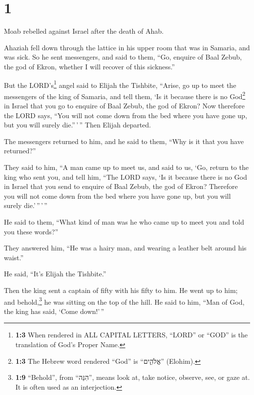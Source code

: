 \hypertarget{section}{%
\section{1}\label{section}}

 Moab rebelled against Israel after the death of Ahab.

 Ahaziah fell down through the lattice in his upper room
that was in Samaria, and was sick. So he sent messengers, and said to
them, ``Go, enquire of Baal Zebub, the god of Ekron, whether I will
recover of this sickness.''

 But the LORD's\footnote{\textbf{1:3} When rendered in ALL
  CAPITAL LETTERS, ``LORD'' or ``GOD'' is the translation of God's
  Proper Name.} angel said to Elijah the Tishbite, ``Arise, go up to
meet the messengers of the king of Samaria, and tell them, `Is it
because there is no God\footnote{\textbf{1:3} The Hebrew word rendered
  ``God'' is ``אֱלֹהִ֑ים'' (Elohim).} in Israel that you go to enquire
of Baal Zebub, the god of Ekron?  Now therefore the LORD
says, ``You will not come down from the bed where you have gone up, but
you will surely die.''\,'\,'' Then Elijah departed.

 The messengers returned to him, and he said to them,
``Why is it that you have returned?''

 They said to him, ``A man came up to meet us, and said to
us, `Go, return to the king who sent you, and tell him, ``The LORD says,
`Is it because there is no God in Israel that you send to enquire of
Baal Zebub, the god of Ekron? Therefore you will not come down from the
bed where you have gone up, but you will surely die.'\,''\,'\,''

 He said to them, ``What kind of man was he who came up to
meet you and told you these words?''

 They answered him, ``He was a hairy man, and wearing a
leather belt around his waist.''

He said, ``It's Elijah the Tishbite.''

 Then the king sent a captain of fifty with his fifty to
him. He went up to him; and behold,\footnote{\textbf{1:9} ``Behold'',
  from ``הִנֵּה'', means look at, take notice, observe, see, or gaze at.
  It is often used as an interjection.} he was sitting on the top of the
hill. He said to him, ``Man of God, the king has said, `Come down!'\,''

